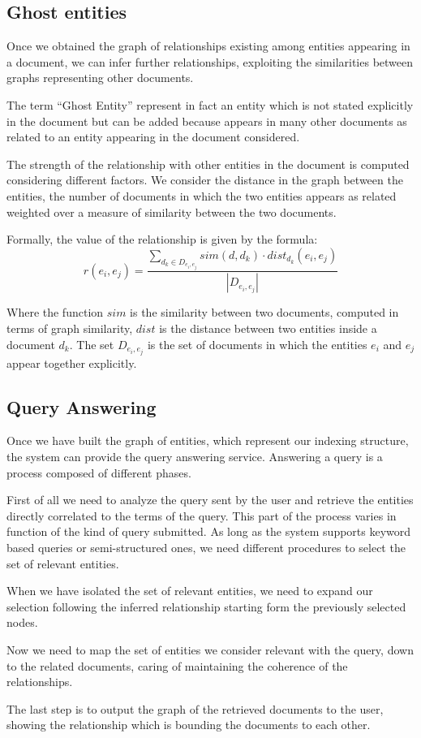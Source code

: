 \documentclass{acm_proc_article-sp-sigmod07}
\begin{document}
\subsection{Ghost entities}
Once we obtained the graph of relationships existing among entities
appearing in a document, we can infer further relationships, exploiting
the similarities between graphs representing other documents.

The term ``Ghost Entity'' represent in fact an entity which is not stated
explicitly in the document but can be added because appears in many other
documents as related to an entity appearing in the document considered.

The strength of the relationship with other entities in the document is
computed considering different factors.
We consider the distance in the graph between the entities, the number of
documents in which the two entities appears as related weighted over a
measure of similarity between the two documents.

Formally, the value of the relationship is given by the formula:
$$
r(e_{i}, e_{j}) = \frac{ \sum_{d_{k} \in D_{e_{i}, e_{j}} } {sim(d, d_{k}) } \cdot
dist_{d_{k}}(e_{i},e_{j}) }{|D_{e_{i},e_{j} }|}
$$

Where the function $sim$ is the similarity between two documents, computed
in terms of graph similarity, $dist$ is the distance between two entities
inside a document $d_{k}$.
The set $D_{e_{i}, e_{j}}$ is the set of documents in which the entities
$e_{i}$ and $e_{j}$ appear together explicitly.


\subsection{Query Answering}
Once we have built the graph of entities, which represent our indexing
structure, the system can provide the query answering service.
Answering a query is a process composed of different phases.

First of all we need to analyze the query sent by the user and retrieve
the entities directly correlated to the terms of the query.
This part of the process varies in function of the kind of query
submitted. As long as the system supports keyword based queries or
semi-structured ones, we need different procedures to select the set of
relevant entities.

When we have isolated the set of relevant entities, we need to expand our
selection following the inferred relationship starting form the previously
selected nodes.

Now we need to map the set of entities we consider relevant with the
query, down to the related documents, caring of maintaining the coherence
of the relationships.

The last step is to output the graph of the retrieved documents to the
user, showing the relationship which is bounding the documents to each
other.
\end{document}
